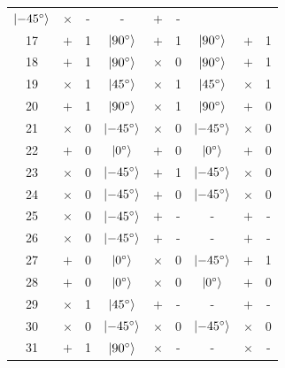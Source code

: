 \begin{longtable}{c|ccc|ccc|cc}
  $\ket{\SI{-45}{\degree}}$ & $\times$ & - & -
  & $+$      & - \\
  \rowcolor{blue!20} 17 & $+$      & 1 & $\ket{\SI{90}{\degree}}$
  & $+$      & 1 & $\ket{\SI{90}{\degree}}$  & $+$      & 1 \\
  \rowcolor{orange!20} 18 & $+$      & 1 & $\ket{\SI{90}{\degree}}$
  & $\times$ & 0 & $\ket{\SI{90}{\degree}}$  & $+$      & 1 \\
  \rowcolor{blue!20} 19 & $\times$ & 1 & $\ket{\SI{45}{\degree}}$
  & $\times$ & 1 & $\ket{\SI{45}{\degree}}$  & $\times$ & 1 \\
  \rowcolor{red!20} 20 & $+$      & 1 & $\ket{\SI{90}{\degree}}$
  & $\times$ & 1 & $\ket{\SI{90}{\degree}}$  & $+$      & 0 \\
  \rowcolor{blue!20} 21 & $\times$ & 0 & $\ket{\SI{-45}{\degree}}$
  & $\times$ & 0 & $\ket{\SI{-45}{\degree}}$ & $\times$ & 0 \\
  \rowcolor{blue!20} 22 & $+$      & 0 & $\ket{\SI{0}{\degree}}$
  & $+$      & 0 & $\ket{\SI{0}{\degree}}$   & $+$      & 0 \\
  \rowcolor{orange!20} 23 & $\times$ & 0 & $\ket{\SI{-45}{\degree}}$
  & $+$      & 1 & $\ket{\SI{-45}{\degree}}$ & $\times$ & 0 \\
  \rowcolor{orange!20} 24 & $\times$ & 0 & $\ket{\SI{-45}{\degree}}$
  & $+$      & 0 & $\ket{\SI{-45}{\degree}}$ & $\times$ & 0 \\
  25                                      & $\times$ & 0 &
  $\ket{\SI{-45}{\degree}}$ & $+$      & - & -
  & $+$      & - \\
  26                                      & $\times$ & 0 &
  $\ket{\SI{-45}{\degree}}$ & $+$      & - & -
  & $+$      & - \\
  \rowcolor{red!20} 27 & $+$      & 0 & $\ket{\SI{0}{\degree}}$
  & $\times$ & 0 & $\ket{\SI{-45}{\degree}}$   & $+$      & 1 \\
  \rowcolor{orange!20} 28 & $+$      & 0 & $\ket{\SI{0}{\degree}}$
  & $\times$ & 0 & $\ket{\SI{0}{\degree}}$   & $+$      & 0 \\
  29                                      & $\times$ & 1 &
  $\ket{\SI{45}{\degree}}$  & $+$      & - & -
  & $+$      & - \\
  \rowcolor{blue!20} 30 & $\times$ & 0 & $\ket{\SI{-45}{\degree}}$
  & $\times$ & 0 & $\ket{\SI{-45}{\degree}}$ & $\times$ & 0 \\
  31                                      & $+$      & 1 &
  $\ket{\SI{90}{\degree}}$  & $\times$ & - & -
  & $\times$ & - \\

\end{longtable}

